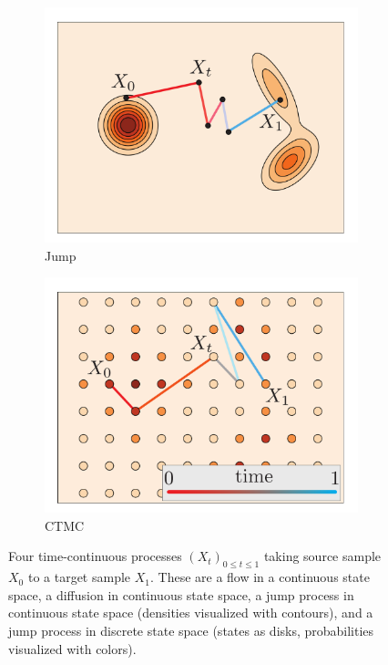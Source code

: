 \documentclass{fairmeta}
\numberwithin{equation}{section}
\begin{document}
\begin{figure}
\begin{subfigure}[b]{0.24\textwidth}
\includegraphics[width=\textwidth]{assets/types/type_jump.pdf}
\caption{Jump}
\label{fig:types:jump}
\end{subfigure}
\hfill
\begin{subfigure}[b]{0.24\textwidth}
\centering
\includegraphics[width=\textwidth]{assets/types/type_ctmc_.pdf}
\caption{CTMC}
\label{fig:types:ctmc}
\end{subfigure}
\caption{Four time-continuous processes $(X_t)_{0\leq t \leq 1}$ taking source sample $X_0$ to a target sample $X_1$.
These are a flow in a continuous state space, a diffusion in continuous state space, a jump process in continuous state space (densities visualized with contours), and a jump process in discrete state space (states as disks, probabilities visualized with colors). }
\label{fig:types}
\end{figure}
\end{document}

